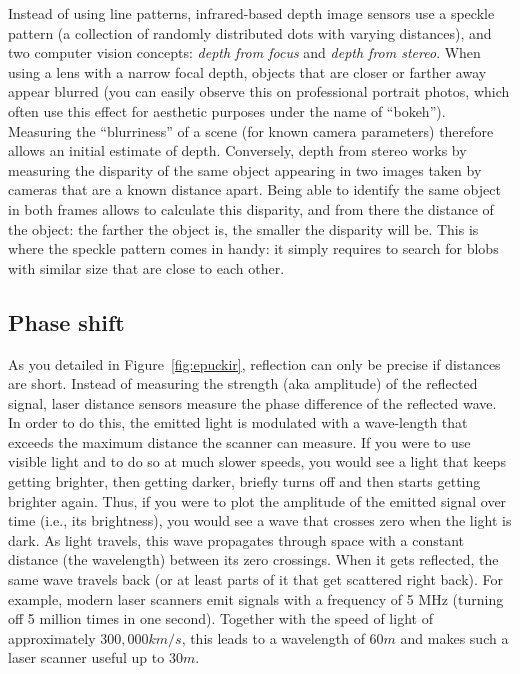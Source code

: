 Instead of using line patterns, infrared-based depth image sensors use a speckle pattern (a collection of randomly distributed dots with varying distances), and two computer vision concepts: \textsl{depth from focus} and \textsl{depth from stereo}. When using a lens with a narrow focal depth, objects that are closer or farther away appear blurred (you can easily observe this on professional portrait photos, which often use this effect for aesthetic purposes under the name of ``bokeh'').
Measuring the ``blurriness'' of a scene (for known camera parameters) therefore allows an initial estimate of depth.
Conversely, depth from stereo works by measuring the disparity of the same object appearing in two images taken by cameras that are a known distance apart. Being able to identify the same object in both frames allows to calculate this disparity, and from there the distance of the object: the farther the object is, the smaller the disparity will be.
This is where the speckle pattern comes in handy: it simply requires to search for blobs with similar size that are close to each other.

\subsection{Phase shift}\label{sec:phaseshiftsensors}

As you detailed in Figure~\ref{fig:epuckir}, reflection can only be precise if distances are short. Instead of measuring the strength (aka amplitude) of the reflected signal, laser distance sensors measure the phase difference of the reflected wave. In order to do this, the emitted light is modulated with a wave-length that exceeds the maximum distance the scanner can measure.
If you were to use visible light and to do so at much slower speeds, you would see a light that keeps getting brighter, then getting darker, briefly turns off and then starts getting brighter again.
Thus, if you were to plot the amplitude of the emitted signal over time (i.e., its brightness), you would see a wave that crosses zero when the light is dark.
As light travels, this wave propagates through space with a constant distance (the wavelength) between its zero crossings. When it gets reflected, the same wave travels back (or at least parts of it that get scattered right back). For example, modern laser scanners emit signals with a frequency of 5 MHz (turning off 5 million times in one second). Together with the speed of light of approximately $300,000km/s$, this leads to a wavelength of $60m$ and makes such a laser scanner useful up to $30m$.

